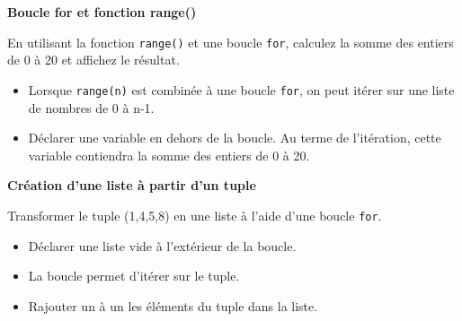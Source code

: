 	
    \begin{Exercice}[5 minutes] \textbf{Boucle for et fonction range()}
      	
      	En utilisant la fonction \lstinline{range()} et une boucle \lstinline{for}, calculez la somme des entiers de 0 à 20 et affichez le résultat.
    
        \begin{conseil}
           \begin{itemize}
           	\item Lorsque \lstinline{range(n)} est combinée à une boucle \lstinline{for}, on peut itérer sur une liste de nombres de 0 à n-1.
           	\item Déclarer une variable en dehors de la boucle. Au terme de l'itération, cette variable contiendra la somme des entiers de 0 à 20.
           \end{itemize}
		     
        \end{conseil}
        
        \begin{solution}
            
        \end{solution}
    \end{Exercice}
    
    \begin{Exercice}[5 minutes] \textbf{Création d'une liste à partir d'un tuple}
      	
      	Transformer le tuple (1,4,5,8) en une liste à l'aide d'une boucle \lstinline{for}.
    
        \begin{conseil}
           \begin{itemize}
           	\item Déclarer une liste vide à l'extérieur de la boucle.
           	\item La boucle permet d'itérer sur le tuple.
           	\item Rajouter un à un les éléments du tuple dans la liste.
           \end{itemize}
		     
        \end{conseil}
        
        \begin{solution}
            
        \end{solution}
    \end{Exercice}
    
